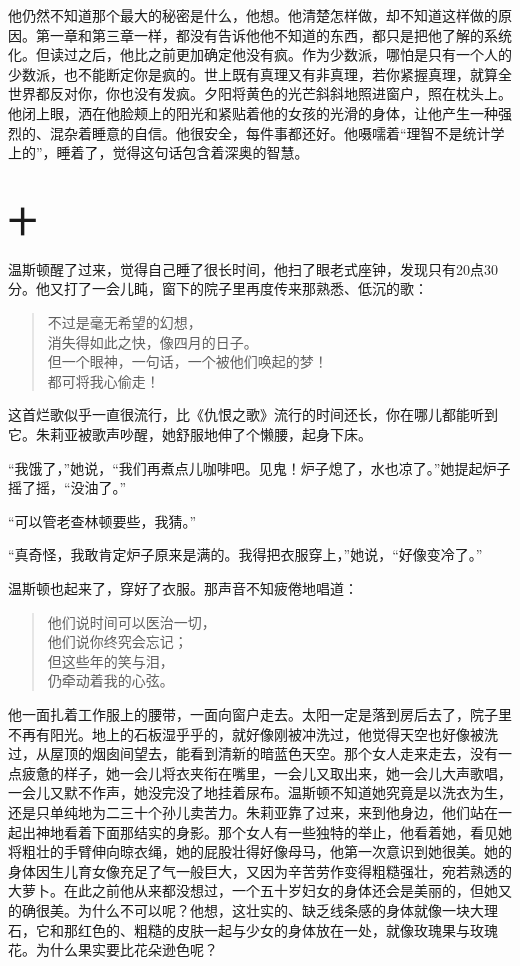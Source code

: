 他仍然不知道那个最大的秘密是什么，他想。他清楚怎样做，却不知道这样做的原因。第一章和第三章一样，都没有告诉他他不知道的东西，都只是把他了解的系统化。但读过之后，他比之前更加确定他没有疯。作为少数派，哪怕是只有一个人的少数派，也不能断定你是疯的。世上既有真理又有非真理，若你紧握真理，就算全世界都反对你，你也没有发疯。夕阳将黄色的光芒斜斜地照进窗户，照在枕头上。他闭上眼，洒在他脸颊上的阳光和紧贴着他的女孩的光滑的身体，让他产生一种强烈的、混杂着睡意的自信。他很安全，每件事都还好。他嗫嚅着``理智不是统计学上的''，睡着了，觉得这句话包含着深奥的智慧。

\section*{十}\label{ux5341ux516b}

温斯顿醒了过来，觉得自己睡了很长时间，他扫了眼老式座钟，发现只有20点30分。他又打了一会儿盹，窗下的院子里再度传来那熟悉、低沉的歌：

\begin{quotation}
  \noindent
不过是毫无希望的幻想，\\
消失得如此之快，像四月的日子。\\
但一个眼神，一句话，一个被他们唤起的梦！\\
都可将我心偷走！
\end{quotation}

这首烂歌似乎一直很流行，比《仇恨之歌》流行的时间还长，你在哪儿都能听到它。朱莉亚被歌声吵醒，她舒服地伸了个懒腰，起身下床。

``我饿了，''她说，``我们再煮点儿咖啡吧。见鬼！炉子熄了，水也凉了。''她提起炉子摇了摇，``没油了。''

``可以管老查林顿要些，我猜。''

``真奇怪，我敢肯定炉子原来是满的。我得把衣服穿上，''她说，``好像变冷了。''

温斯顿也起来了，穿好了衣服。那声音不知疲倦地唱道：

\begin{quotation}
  \noindent
他们说时间可以医治一切，\\
他们说你终究会忘记；\\
但这些年的笑与泪，\\
仍牵动着我的心弦。
\end{quotation}

他一面扎着工作服上的腰带，一面向窗户走去。太阳一定是落到房后去了，院子里不再有阳光。地上的石板湿乎乎的，就好像刚被冲洗过，他觉得天空也好像被洗过，从屋顶的烟囱间望去，能看到清新的暗蓝色天空。那个女人走来走去，没有一点疲惫的样子，她一会儿将衣夹衔在嘴里，一会儿又取出来，她一会儿大声歌唱，一会儿又默不作声，她没完没了地挂着尿布。温斯顿不知道她究竟是以洗衣为生，还是只单纯地为二三十个孙儿卖苦力。朱莉亚靠了过来，来到他身边，他们站在一起出神地看着下面那结实的身影。那个女人有一些独特的举止，他看着她，看见她将粗壮的手臂伸向晾衣绳，她的屁股壮得好像母马，他第一次意识到她很美。她的身体因生儿育女像充足了气一般巨大，又因为辛苦劳作变得粗糙强壮，宛若熟透的大萝卜。在此之前他从来都没想过，一个五十岁妇女的身体还会是美丽的，但她又的确很美。为什么不可以呢？他想，这壮实的、缺乏线条感的身体就像一块大理石，它和那红色的、粗糙的皮肤一起与少女的身体放在一处，就像玫瑰果与玫瑰花。为什么果实要比花朵逊色呢？

